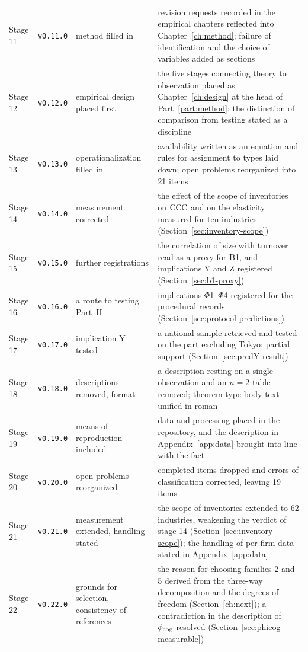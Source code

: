 \begin{longtable}{@{}ll>{\raggedright\arraybackslash}p{}>{\raggedright\arraybackslash}p{}@{}}
Stage 11 & \texttt{v0.11.0} & method filled in & revision requests recorded in the empirical chapters reflected into Chapter~\ref{ch:method}; failure of identification and the choice of variables added as sections \\
Stage 12 & \texttt{v0.12.0} & empirical design placed first & the five stages connecting theory to observation placed as Chapter~\ref{ch:design} at the head of Part~\ref{part:method}; the distinction of comparison from testing stated as a discipline \\
Stage 13 & \texttt{v0.13.0} & operationalization filled in & availability written as an equation and rules for assignment to types laid down; open problems reorganized into 21 items \\
Stage 14 & \texttt{v0.14.0} & measurement corrected & the effect of the scope of inventories on $\mathrm{CCC}$ and on the elasticity measured for ten industries (Section~\ref{sec:inventory-scope}) \\
Stage 15 & \texttt{v0.15.0} & further registrations & the correlation of size with turnover read as a proxy for B1, and implications Y and Z registered (Section~\ref{sec:b1-proxy}) \\
Stage 16 & \texttt{v0.16.0} & a route to testing Part~II & implications $\Phi$1--$\Phi$4 registered for the procedural records (Section~\ref{sec:protocol-predictions}) \\
Stage 17 & \texttt{v0.17.0} & implication Y tested & a national sample retrieved and tested on the part excluding Tokyo; partial support (Section~\ref{sec:predY-result}) \\
Stage 18 & \texttt{v0.18.0} & descriptions removed, format & a description resting on a single observation and an $n=2$ table removed; theorem-type body text unified in roman \\
Stage 19 & \texttt{v0.19.0} & means of reproduction included & data and processing placed in the repository, and the description in Appendix~\ref{app:data} brought into line with the fact \\
Stage 20 & \texttt{v0.20.0} & open problems reorganized & completed items dropped and errors of classification corrected, leaving 19 items \\
Stage 21 & \texttt{v0.21.0} & measurement extended, handling stated & the scope of inventories extended to 62 industries, weakening the verdict of stage 14 (Section~\ref{sec:inventory-scope}); the handling of per-firm data stated in Appendix~\ref{app:data} \\
Stage 22 & \texttt{v0.22.0} & grounds for selection, consistency of references & the reason for choosing families 2 and 5 derived from the three-way decomposition and the degrees of freedom (Section~\ref{ch:next}); a contradiction in the description of $\phi_{\rm cog}$ resolved (Section~\ref{sec:phicog-measurable}) \\

\end{longtable}
